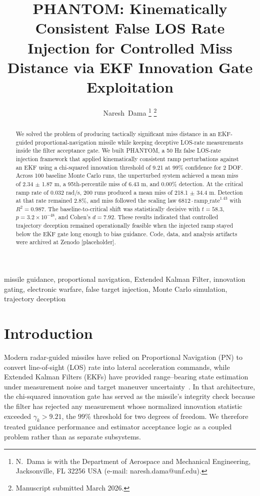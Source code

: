 \documentclass[journal]{IEEEtran}
\title{PHANTOM: Kinematically Consistent False LOS Rate Injection
for Controlled Miss Distance via EKF Innovation Gate Exploitation}
\author{Naresh~Dama%
\thanks{N.~Dama is with the Department of Aerospace and Mechanical
Engineering, Jacksonville, FL 32256 USA
(e-mail: naresh.dama@unf.edu).}%
\thanks{Manuscript submitted March 2026.}}
\begin{document}
\maketitle

\begin{abstract}
We solved the problem of producing tactically significant miss distance in an EKF-guided proportional-navigation missile while keeping deceptive LOS-rate measurements inside the filter acceptance gate. We built PHANTOM, a 50 Hz false LOS-rate injection framework that applied kinematically consistent ramp perturbations against an EKF using a chi-squared innovation threshold of 9.21 at 99\% confidence for 2 DOF. Across 100 baseline Monte Carlo runs, the unperturbed system achieved a mean miss of 2.34 $\pm$ 1.87 m, a 95th-percentile miss of 6.43 m, and 0.00\% detection. At the critical ramp rate of 0.032 rad/s, 200 runs produced a mean miss of 218.1 $\pm$ 34.4 m. Detection at that rate remained 2.8\%, and miss followed the scaling law $6812 \cdot \mathrm{ramp\_rate}^{1.43}$ with $R^2 = 0.987$. The baseline-to-critical shift was statistically decisive with $t = 58.3$, $p = 3.2 \times 10^{-48}$, and Cohen's $d = 7.92$. These results indicated that controlled trajectory deception remained operationally feasible when the injected ramp stayed below the EKF gate long enough to bias guidance. Code, data, and analysis artifacts were archived at Zenodo [placeholder].
\end{abstract}

\begin{IEEEkeywords}
missile guidance, proportional navigation, Extended Kalman Filter,
innovation gating, electronic warfare, false target injection,
Monte Carlo simulation, trajectory deception
\end{IEEEkeywords}

\section{Introduction}
\label{sec:intro}

Modern radar-guided missiles have relied on Proportional Navigation
(PN) to convert line-of-sight (LOS) rate into lateral acceleration
commands, while Extended Kalman Filters (EKFs) have provided
range--bearing state estimation under measurement noise and target
maneuver uncertainty~\cite{zarchan2012,barshalom2001}.  In that
architecture, the chi-squared innovation gate has served as the
missile's integrity check because the filter has rejected any
measurement whose normalized innovation statistic exceeded
$\gamma_k > 9.21$, the $99\%$ threshold for two degrees of freedom.
We therefore treated guidance performance and estimator acceptance
logic as a coupled problem rather than as separate subsystems.
\end{document}
